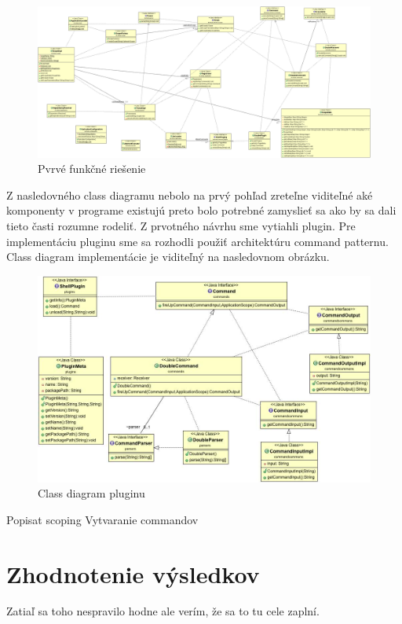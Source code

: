  \begin{figure}[!htbp]
	\centering
	\includegraphics[width=15cm]{img/first_attemp_class_diag.jpg}
	\caption{Pvrvé funkčné riešenie}
	\label{fig:test}
\end{figure}
\newline
Z nasledovného class diagramu nebolo na prvý pohľad zreteľne viditeľné aké komponenty v programe existujú preto bolo potrebné zamyslieť sa ako by sa dali tieto časti rozumne rodeliť. Z prvotného návrhu sme vytiahli plugin. Pre implementáciu pluginu sme sa rozhodli použiť architektúru command patternu. Class diagram implementácie je viditeľný na nasledovnom obrázku.
 \begin{figure}[!htbp]
	\centering
	\includegraphics[width=15cm]{img/plugin_class.jpg}
	\caption{Class diagram pluginu}
	\label{fig:test}
\end{figure}
\newline
Popisat scoping
Vytvaranie commandov

\section{Zhodnotenie výsledkov}
Zatiaľ sa toho nespravilo hodne ale verím, že sa to tu cele zaplní.